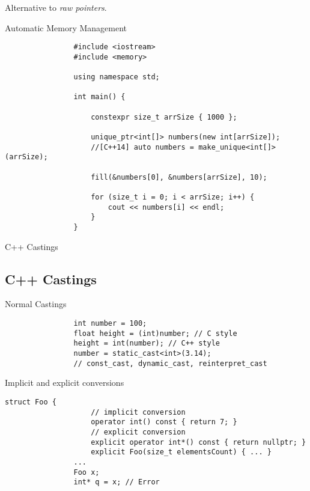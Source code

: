 \documentclass{beamer}
\newcommand{\normalSizeItem}[1] {
  \normalsize{\item #1}
}
\begin{document}
		\begin{frame}[fragile]{Alternative to \textit{raw pointers}. }	
			\begin{itemize}
			
				\normalSizeItem { Automatic Memory Management }
				\begin{lstlisting}
				#include <iostream>
				#include <memory>
				
				using namespace std;
				
				int main() {	
					
					constexpr size_t arrSize { 1000 };
					
					unique_ptr<int[]> numbers(new int[arrSize]);
					//[C++14] auto numbers = make_unique<int[]>(arrSize);
					
					fill(&numbers[0], &numbers[arrSize], 10);
					
					for (size_t i = 0; i < arrSize; i++) {
						cout << numbers[i] << endl;
					}
				}
				\end{lstlisting}				
			\end{itemize}
		\end{frame}
		
		\begin{frame}[fragile]{C++ Castings}	
			\subsection{C++ Castings}		
			\begin{itemize}
			
				\normalSizeItem { Normal Castings }
				\begin{lstlisting}
				int number = 100;
				float height = (int)number; // C style
				height = int(number); // C++ style
				number = static_cast<int>(3.14);
				// const_cast, dynamic_cast, reinterpret_cast
				\end{lstlisting}
				
				\normalSizeItem { Implicit and explicit conversions }
				\begin{lstlisting}[basicstyle={\tiny\ttfamily}]
				struct Foo {
					// implicit conversion
					operator int() const { return 7; } 
					// explicit conversion
					explicit operator int*() const { return nullptr; }   
					explicit Foo(size_t elementsCount) { ... }
				...
				Foo x;
				int* q = x; // Error
				\end{lstlisting}
				
			\end{itemize}
		\end{frame}
		
\end{document}
